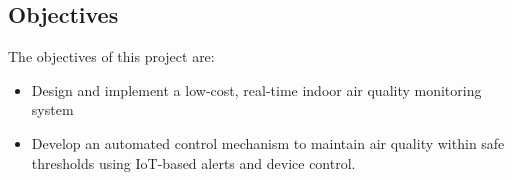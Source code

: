 \subsection{Objectives}

The objectives of this project are:
\begin{itemize}
    \item Design and implement a low-cost, real-time indoor air quality monitoring system
    \item Develop an automated control mechanism to maintain air quality within safe thresholds using IoT-based alerts and device control.
\end{itemize}